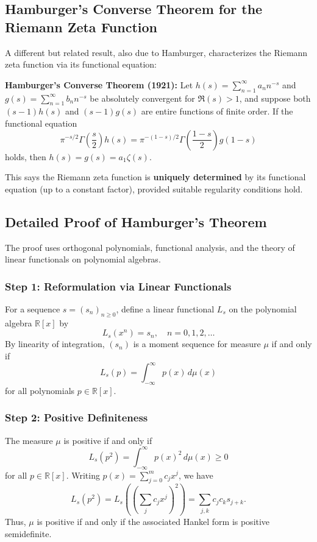 \documentclass{article}
\begin{document}
\subsection*{Hamburger's Converse Theorem for the Riemann Zeta Function}

A different but related result, also due to Hamburger, characterizes the Riemann zeta function via its functional equation:

\textbf{Hamburger's Converse Theorem (1921):} Let $h(s) = \sum_{n=1}^{\infty} a_n n^{-s}$ and $g(s) = \sum_{n=1}^{\infty} b_n n^{-s}$ be absolutely convergent for $\Re(s) > 1$, and suppose both $(s-1)h(s)$ and $(s-1)g(s)$ are entire functions of finite order. If the functional equation
\[
\pi^{-s/2} \Gamma\left(\frac{s}{2}\right) h(s) = \pi^{-(1-s)/2} \Gamma\left(\frac{1-s}{2}\right) g(1-s)
\]
holds, then $h(s) = g(s) = a_1 \zeta(s)$.

This says the Riemann zeta function is \textbf{uniquely determined} by its functional equation (up to a constant factor), provided suitable regularity conditions hold.

\subsection*{Detailed Proof of Hamburger's Theorem}

The proof uses orthogonal polynomials, functional analysis, and the theory of linear functionals on polynomial algebras.

\subsubsection*{Step 1: Reformulation via Linear Functionals}

For a sequence $s = (s_n)_{n \geq 0}$, define a linear functional $L_s$ on the polynomial algebra $\mathbb{R}[x]$ by
\[
L_s(x^n) = s_n, \quad n = 0, 1, 2, \ldots
\]
By linearity of integration, $(s_n)$ is a moment sequence for measure $\mu$ if and only if
\[
L_s(p) = \int_{-\infty}^{\infty} p(x) \, d\mu(x)
\]
for all polynomials $p \in \mathbb{R}[x]$.

\subsubsection*{Step 2: Positive Definiteness}

The measure $\mu$ is positive if and only if
\[
L_s(p^2) = \int_{-\infty}^{\infty} p(x)^2 \, d\mu(x) \geq 0
\]
for all $p \in \mathbb{R}[x]$. Writing $p(x) = \sum_{j=0}^m c_j x^j$, we have
\[
L_s(p^2) = L_s\left(\left(\sum_j c_j x^j\right)^2\right) = \sum_{j,k} c_j c_k s_{j+k}.
\]
Thus, $\mu$ is positive if and only if the associated Hankel form is positive semidefinite.
\end{document}
